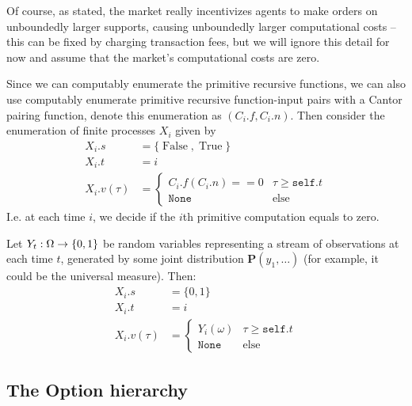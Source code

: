 \documentclass{article}
\begin{document}
Of course, as stated, the market really incentivizes agents to make orders on unboundedly larger supports, causing unboundedly larger computational costs -- this can be fixed by charging transaction fees, but we will ignore this detail for now and assume that the market's computational costs are zero.

\begin{example}
    \label{ex:0}
    Since we can computably enumerate the primitive recursive functions, we can also use computably enumerate primitive recursive function-input pairs with a Cantor pairing function, denote this enumeration as $(C_i.f, C_i.n)$. Then consider the enumeration of finite processes $X_i$ given by 
    \begin{align*}
        X_i.s &= \{\operatorname{False}, \operatorname{True}\} \\
        X_i.t &= i \\
        X_i.v(\tau) &= 
        \begin{cases} 
            C_i.f(C_i.n) == 0 & \tau \ge \mathtt{self}.t \\
            \mathtt{None} & \mathrm{else}
        \end{cases}
    \end{align*}
    I.e. at each time $i$, we decide if the $i$th primitive computation equals to zero.
\end{example}

\begin{example}
    Let $Y_t:\Omega\to\{0,1\}$ be random variables representing a stream of observations at each time $t$, generated by some joint distribution $\mathbf{P}(y_1,\dots)$ (for example, it could be the universal measure). Then:
    \begin{align*}
        X_i.s &= \{0, 1\} \\
        X_i.t &= i \\
        X_i.v(\tau) &= 
        \begin{cases} 
             Y_i(\omega) & \tau \ge \mathtt{self}.t \\
            \mathtt{None} & \mathrm{else}
        \end{cases}
    \end{align*}
    
\end{example}

\subsection{The Option hierarchy}
\end{document}
